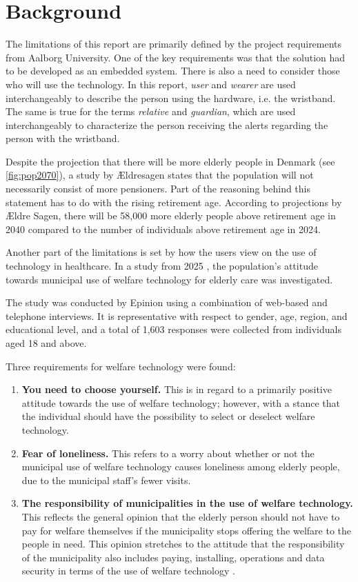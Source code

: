 \section{Background}
The limitations of this report are primarily defined by the project requirements from Aalborg University. One of the key requirements was that the solution had to be developed as an embedded system. There is also a need to consider those who will use the technology. In this report, \textit{user} and \textit{wearer} are used interchangeably to describe the person using the hardware, i.e. the wristband. The same is true for the terms \textit{relative} and \textit{guardian}, which are used interchangeably to characterize the person receiving the alerts regarding the person with the wristband. 

Despite the projection that there will be more elderly people in Denmark (see \autoref{fig:pop2070}), a study by Ældresagen states that the population will not necessarily consist of more pensioners. Part of the reasoning behind this statement has to do with the rising retirement age. According to projections by Ældre Sagen, there will be 58,000 more elderly people above retirement age in 2040 compared to the number of individuals above retirement age in 2024.

Another part of the limitations is set by how the users view on the use of technology in healthcare. In a study from 2025 \cite{noauthor_undersogelse_nodate}, the population's attitude towards municipal use of welfare technology for elderly care was investigated.

The study was conducted by Epinion using a combination of web-based and telephone interviews. It is representative with respect to gender, age, region, and educational level, and a total of 1,603 responses were collected from individuals aged 18 and above.

Three requirements for welfare technology were found: 

\begin{enumerate}
\item \textbf{You need to choose yourself. }
This is in regard to a primarily positive attitude towards the use of welfare technology; however, with a stance that the individual should have the possibility to select or deselect welfare technology.

\item \textbf{Fear of loneliness. }
This refers to a worry about whether or not the municipal use of welfare technology causes loneliness among elderly people, due to the municipal staff's fewer visits. 

\item \textbf{The responsibility of municipalities in the use of welfare technology. }This reflects the general opinion that the elderly person should not have to pay for welfare themselves if the municipality stops offering the welfare to the people in need. This opinion stretches to the attitude that the responsibility of the municipality also includes paying, installing, operations and data security in terms of the use of welfare technology \cite{noauthor_undersogelse_nodate}.
\end{enumerate}

